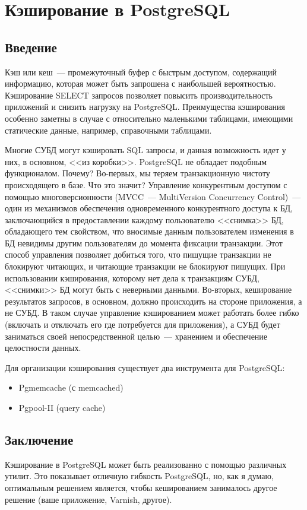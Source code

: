 \chapter{Кэширование в PostgreSQL}

\begin{epigraphs}
\end{epigraphs}

\section{Введение}

Кэш или кеш~--- промежуточный буфер с быстрым доступом, содержащий информацию, которая может быть запрошена с наибольшей вероятностью. Кэширование SELECT запросов позволяет повысить производительность приложений и снизить нагрузку на PostgreSQL. Преимущества кэширования особенно заметны в случае с относительно маленькими таблицами, имеющими статические данные, например, справочными таблицами.

Многие СУБД могут кэшировать SQL запросы, и данная возможность идет у них, в основном, <<из коробки>>. PostgreSQL не обладает подобным функционалом. Почему? Во-первых, мы теряем транзакционную чистоту происходящего в базе. Что это значит? Управление конкурентным доступом с помощью многоверсионности (MVCC~--- MultiVersion Concurrency Control)~--- один из механизмов обеспечения одновременного конкурентного доступа к БД, заключающийся в предоставлении каждому пользователю <<снимка>> БД, обладающего тем свойством, что вносимые данным пользователем изменения в БД невидимы другим пользователям до момента фиксации транзакции. Этот способ управления позволяет добиться того, что пишущие транзакции не блокируют читающих, и читающие транзакции не блокируют пишущих. При использовании кэширования, которому нет дела к транзакциям СУБД, <<снимки>> БД могут быть с неверными данными. Во-вторых, кеширование результатов запросов, в основном, должно происходить на стороне приложения, а не СУБД. В таком случае управление кэшированием может работать более гибко (включать и отключать его где потребуется для приложения), а СУБД будет заниматься своей непосредственной целью~--- хранением и обеспечение целостности данных.

Для организации кэширования существует два инструмента для PostgreSQL:

\begin{itemize}
  \item Pgmemcache (с memcached)
  \item Pgpool-II (query cache)
\end{itemize}





\section{Заключение}

Кэширование в PostgreSQL может быть реализованно с помощью различных утилит. Это показывает отличную гибкость PostgreSQL, но, как я думаю, оптимальным решением является, чтобы кешированием занималось другое решение (ваше приложение, Varnish, другое).
